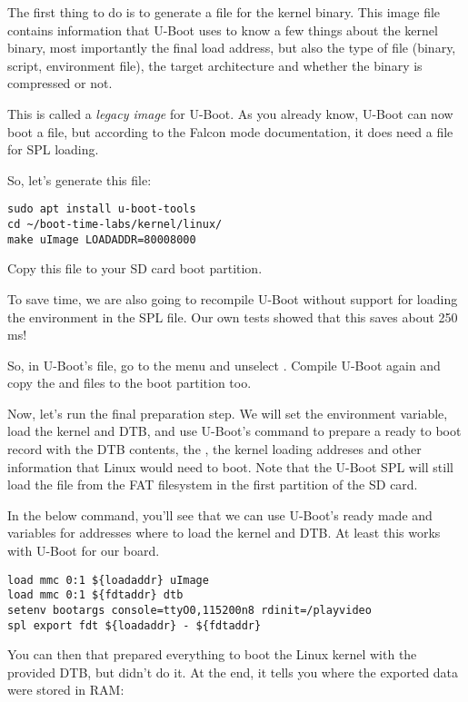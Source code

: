 The first thing to do is to generate a  file for the kernel
binary. This image file contains information that U-Boot uses to know a
few things about the kernel binary, most importantly the final load
address, but also the type of file (binary, script, environment file),
the target architecture and whether the binary is compressed or not.

This is called a {\em legacy image} for U-Boot. As you already know,
U-Boot can now boot a  file, but according to the Falcon
mode documentation, it does need a  file for SPL loading.

So, let's generate this file:
\begin{verbatim}
sudo apt install u-boot-tools
cd ~/boot-time-labs/kernel/linux/
make uImage LOADADDR=80008000
\end{verbatim}

Copy this  file to your SD card boot partition.

To save time, we are also going to recompile U-Boot without support for
loading the environment in the SPL file. Our own tests showed that this
saves about 250 ms!

So, in U-Boot's  file, go to the 
menu and unselect . Compile U-Boot again
and copy the  and  files to the boot
partition too.

Now, let's run the final preparation step. We will set the
 environment variable, load the kernel and DTB, and
use U-Boot's  command to prepare a ready to boot record
with the DTB contents, the , the kernel loading addreses
and other information that Linux would need to boot. Note that the
U-Boot SPL will still load the  file from the FAT
filesystem in the first partition of the SD card.

In the below command, you'll see that we can use U-Boot's ready made
 and  variables for addresses where to load
the kernel and DTB. At least this works with U-Boot for our board.

\begin{verbatim}
load mmc 0:1 ${loadaddr} uImage
load mmc 0:1 ${fdtaddr} dtb
setenv bootargs console=ttyO0,115200n8 rdinit=/playvideo
spl export fdt ${loadaddr} - ${fdtaddr}
\end{verbatim}

You can then that  prepared everything to boot the
Linux kernel with the provided DTB, but didn't do it. At the end, it
tells you where the exported data were stored in RAM:

